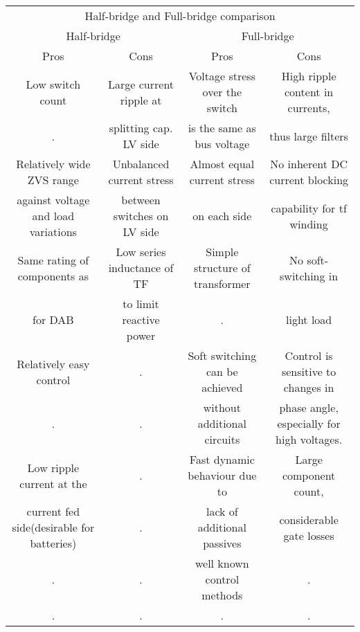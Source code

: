 \documentclass[]{scrartcl}
\begin{document}
\begin{table}[h!]
	\centering 
	\begin{adjustbox}{width=1\textwidth}
		\small
		\begin{tabular}{c c c c} 
			\multicolumn{4}{c}{Half-bridge and Full-bridge comparison} \\ 
			\cmidrule(l){1-4}
			\multicolumn{2}{c}{Half-bridge } & \multicolumn{2}{c}{Full-bridge } \\
			Pros  & Cons & Pros & Cons   \\ %
			
			\midrule %
			\midrule
			Low switch count & Large current ripple at  & Voltage stress over the switch & High ripple content in currents, \\ %
			.  & splitting cap. LV side & is the same as bus voltage & thus large filters \\ %
			Relatively wide ZVS range & Unbalanced current stress & Almost equal current stress  & No inherent DC current  blocking\\ %
			against voltage and load variations & between switches on LV side & on each side &  capability for tf winding \\ %
			Same rating of components as & Low series inductance of TF & Simple structure of transformer & No soft-switching in  \\
			for DAB & to limit reactive power & . & light load \\ 
			Relatively easy control & . & Soft switching can be achieved & Control is sensitive to changes in \\
			. & . & without additional circuits & phase angle, especially for high voltages. \\ 
			Low ripple current at the  & . & Fast dynamic behaviour  due to & Large component count, \\
			current fed side(desirable for batteries) & . & lack of additional passives & considerable gate losses \\ 
			. & . & well known control methods  & . \\ %
			. & . & . & . \\ %
			\bottomrule %
		\end{tabular}
	\end{adjustbox}
	\label{tab:template} %
\end{table}
\end{document}
